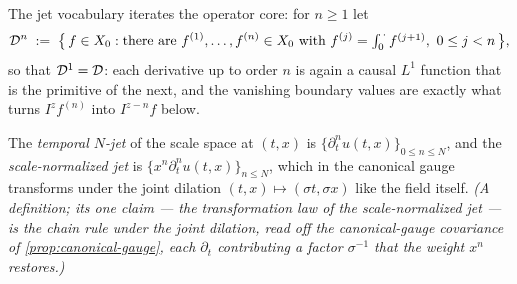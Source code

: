 %
%
%

The jet vocabulary iterates the operator core: for $n \ge 1$ let
\[
  \mathcal{D}^n \;:=\; \bigl\{\, f \in X_0 : \text{there are } f^{(1)}, \dots, f^{(n)} \in X_0
  \text{ with } f^{(j)} = \textstyle\int_0^{\,\cdot} f^{(j+1)},\ 0 \le j < n \,\bigr\},
\]
so that $\mathcal{D}^1 = \mathcal{D}$: each derivative up to order $n$ is again a causal $L^1$
function that is the primitive of the next, and the vanishing boundary values are exactly
what turns $I^{z}f^{(n)}$ into $I^{z-n}f$ below.

\begin{definition}\label{def:jet}
The \emph{temporal $N$-jet} of the scale space at $(t, x)$ is
$\{\partial_t^n u(t, x)\}_{0 \le n \le N}$, and the \emph{scale-normalized jet} is
$\{x^n \partial_t^n u(t, x)\}_{n \le N}$, which in the canonical gauge transforms under the
joint dilation $(t, x) \mapsto (\sigma t, \sigma x)$ like the field itself.
\statusT\quad\emph{(A definition; its one claim --- the transformation law of the
scale-normalized jet --- is the chain rule under the joint dilation, read off the
canonical-gauge covariance of \ref{prop:canonical-gauge}, each $\partial_t$ contributing a
factor $\sigma^{-1}$ that the weight $x^n$ restores.)}
\end{definition}

